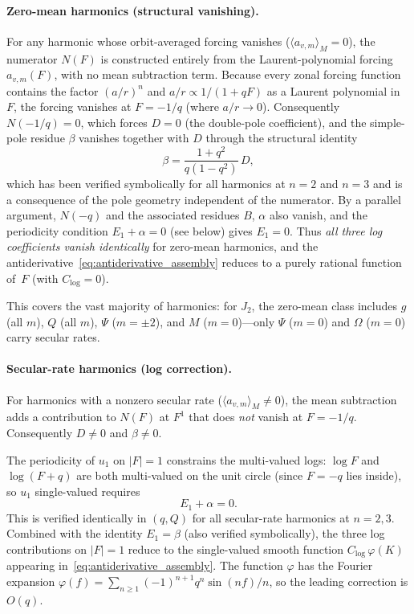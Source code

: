 \documentclass[11pt]{article}
\begin{document}
\paragraph{Zero-mean harmonics (structural vanishing).}
For any harmonic whose orbit-averaged forcing vanishes
($\langle a_{v,m} \rangle_M = 0$), the numerator $N(F)$ is constructed
entirely from the Laurent-polynomial forcing $a_{v,m}(F)$, with no mean
subtraction term.  Because every zonal forcing function contains the
factor $(a/r)^n$ and $a/r \propto 1/(1 + qF)$ as a Laurent polynomial
in~$F$, the forcing vanishes at $F = -1/q$ (where $a/r \to 0$).
Consequently $N(-1/q) = 0$, which forces $D = 0$ (the double-pole
coefficient), and the simple-pole residue $\beta$ vanishes together with $D$
through the structural identity
\begin{equation}
\beta = \frac{1+q^2}{q(1-q^2)}\, D,
\label{eq:beta_D_ratio}
\end{equation}
which has been verified symbolically for all harmonics at $n = 2$ and
$n = 3$ and is a consequence of the pole geometry independent of the
numerator.  By a parallel argument, $N(-q)$ and the associated
residues $B$, $\alpha$ also vanish, and the periodicity condition
$E_1 + \alpha = 0$ (see below) gives $E_1 = 0$.  Thus \emph{all three
log coefficients vanish identically} for zero-mean harmonics, and the
antiderivative~\eqref{eq:antiderivative_assembly} reduces to a purely
rational function of~$F$ (with $C_{\log} = 0$).

This covers the vast majority of harmonics: for $J_2$, the zero-mean
class includes $g$ (all $m$), $Q$ (all $m$), $\Psi$ ($m = \pm 2$),
and $M$ ($m = 0$)---only $\Psi$ ($m = 0$) and $\Omega$ ($m = 0$)
carry secular rates.

\paragraph{Secular-rate harmonics (log correction).}
For harmonics with a nonzero secular rate
($\langle a_{v,m} \rangle_M \neq 0$), the mean subtraction adds
a contribution to $N(F)$ at $F^1$ that does \emph{not} vanish at
$F = -1/q$.  Consequently $D \neq 0$ and $\beta \neq 0$.

The periodicity of $u_1$ on $|F| = 1$ constrains the multi-valued
logs: $\log F$ and $\log(F+q)$ are both multi-valued on the unit
circle (since $F = -q$ lies inside), so $u_1$ single-valued requires
\begin{equation}
E_1 + \alpha = 0.
\label{eq:periodicity_condition}
\end{equation}
This is verified identically in $(q,Q)$ for all secular-rate harmonics
at $n = 2,3$.  Combined with the identity $E_1 = \beta$ (also verified
symbolically), the three log contributions on $|F| = 1$ reduce to
the single-valued smooth function $C_{\log}\,\varphi(K)$ appearing
in~\eqref{eq:antiderivative_assembly}.  The function $\varphi$ has the
Fourier expansion $\varphi(f) = \sum_{n \ge 1} (-1)^{n+1} q^n \sin(nf)/n$,
so the leading correction is $O(q)$.
\end{document}

